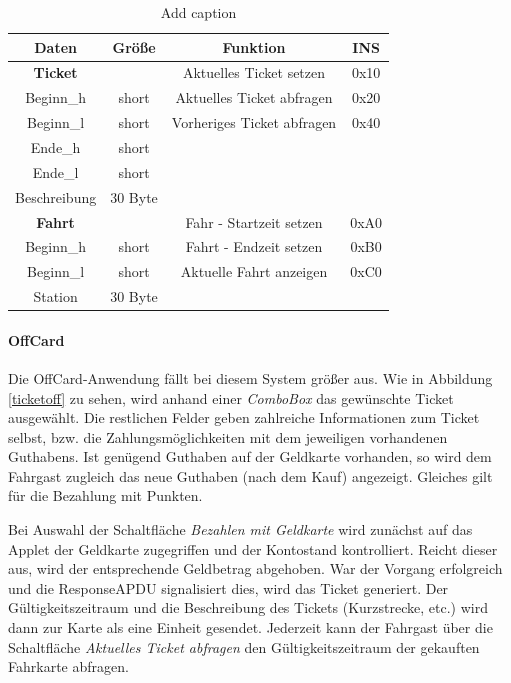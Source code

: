 \documentclass[	a4paper,
			11pt,
			oneside,
			parskip]{scrartcl}
\begin{document}
\begin{table}[htbp]
  \centering
  \caption{Add caption}
    \begin{tabular}{cc|rr}
    \toprule
    \textbf{Daten} & \textbf{Größe} & \multicolumn{1}{c}{\textbf{Funktion}} & \multicolumn{1}{c}{\textbf{INS}} \\
    \hline
    \textbf{Ticket} &       & \multicolumn{1}{c}{Aktuelles Ticket setzen} & \multicolumn{1}{c}{0x10} \\
    Beginn\_h & short & \multicolumn{1}{c}{Aktuelles Ticket abfragen} & \multicolumn{1}{c}{0x20} \\
    Beginn\_l & short & \multicolumn{1}{c}{Vorheriges Ticket abfragen} & \multicolumn{1}{c}{0x40} \\
    Ende\_h & short &       &  \\
    Ende\_l & short  &       &  \\
    Beschreibung & 30 Byte  &       &  \\
    \hline
    \textbf{Fahrt} &   & \multicolumn{1}{c}{Fahr - Startzeit setzen} & \multicolumn{1}{c}{0xA0} \\
    Beginn\_h & short & \multicolumn{1}{c}{Fahrt - Endzeit setzen} & \multicolumn{1}{c}{0xB0} \\
    Beginn\_l & short & \multicolumn{1}{c}{Aktuelle Fahrt anzeigen} & \multicolumn{1}{c}{0xC0} \\
    Station & 30 Byte &       &  \\
    \bottomrule
    \end{tabular}%
  \label{tab:ticketfunc}%
\end{table}%


\paragraph{OffCard} Die OffCard-Anwendung fällt bei diesem System größer aus. Wie in Abbildung \ref{ticketoff} zu sehen, wird anhand einer \textit{ComboBox} das gewünschte Ticket ausgewählt. Die restlichen Felder geben zahlreiche Informationen zum Ticket selbst, bzw. die Zahlungsmöglichkeiten mit dem jeweiligen vorhandenen Guthabens. Ist genügend Guthaben auf der Geldkarte vorhanden, so wird dem Fahrgast zugleich das neue Guthaben (nach dem Kauf) angezeigt. Gleiches gilt für die Bezahlung mit Punkten. \medskip

Bei Auswahl der Schaltfläche \textit{Bezahlen mit Geldkarte} wird zunächst auf das Applet der Geldkarte zugegriffen und der Kontostand kontrolliert. Reicht dieser aus, wird der entsprechende Geldbetrag abgehoben. War der Vorgang erfolgreich und die ResponseAPDU signalisiert dies, wird das Ticket generiert. Der Gültigkeitszeitraum und die Beschreibung des Tickets (Kurzstrecke, etc.) wird dann zur Karte als eine Einheit gesendet. Jederzeit kann der Fahrgast über die Schaltfläche \textit{Aktuelles Ticket abfragen} den Gültigkeitszeitraum der gekauften Fahrkarte abfragen.
\end{document}
